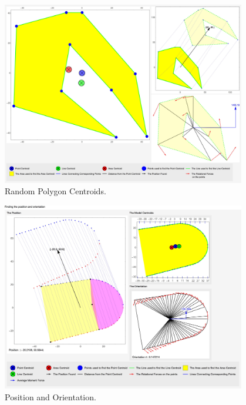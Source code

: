 \begin{figure}[h!]
  \centering
    \includegraphics[width=0.95\textwidth]{Chapter4/Figs/Random_Polygon_Centroids.jpg}
    \caption{Random Polygon Centroids.}\label{fig:RandomPolygonCentroids}
\end{figure}

\begin{figure}[h!]
  \centering
    \includegraphics[width=0.95\textwidth]{Chapter4/Figs/Exagerated_Model_Centroids_With_Pos_Orientation.jpg}
    \caption{Position and Orientation.}\label{fig:ExaggeratedPositionAndOrientation}
\end{figure}

